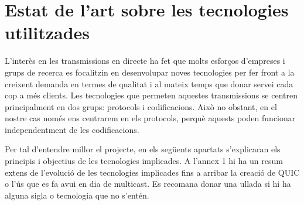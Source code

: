 \section{Estat de l'art sobre les tecnologies utilitzades}
{
    L'interès en les transmissions en directe ha fet que molts esforços d'empreses i grups de recerca
    es focalitzin en desenvolupar noves tecnologies per fer front a la creixent demanda en termes de qualitat
    i al mateix temps que donar servei cada cop a més clients. Les tecnologies que permeten aquestes transmissions
    se centren principalment en dos grups: protocols i codificacions. Això no obstant, en el nostre cas només ens centrarem
    en els protocols, perquè aquests poden funcionar independentment de les codificacions.
    
    Per tal d'entendre millor el projecte, en els següents apartats s'explicaran els principis i objectius de les
    tecnologies implicades. A l'annex 1 hi ha un resum extens de l'evolució de les tecnologies implicades fins a arribar
    la creació de QUIC o l'ús que es fa avui en dia de multicast. Es recomana donar una ullada si hi ha alguna sigla o tecnologia
    que no s'entén.
}

